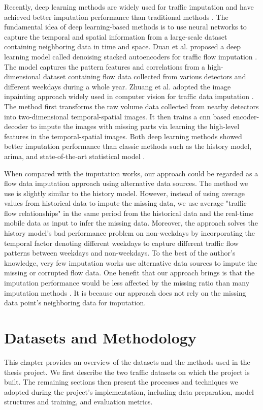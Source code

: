 \documentclass[english]{kththesis}
\begin{document}
Recently, deep learning methods are widely used for traffic imputation and have achieved better imputation performance than traditional methods \cite{duan_dl_imputation, zhuang_cnn_imputation}. The fundamental idea of deep learning-based methods is to use neural networks to capture the temporal and spatial information from a large-scale dataset containing neighboring data in time and space. Duan et al. proposed a deep learning model called denoising stacked autoencoders for traffic flow imputation \cite{duan_dl_imputation}. The model captures the pattern features and correlations from a high-dimensional dataset containing flow data collected from various detectors and different weekdays during a whole year. Zhuang et al. adopted the image inpainting approach widely used in computer vision for traffic data imputation \cite{zhuang_cnn_imputation}. The method first transforms the raw volume data collected from nearby detectors into two-dimensional temporal-spatial images. It then trains a \gls{cnn} based encoder-decoder to impute the images with missing parts via learning the high-level features in the temporal-spatial images. Both deep learning methods showed better imputation performance than classic methods such as the history model, \gls{arima}, and state-of-the-art statistical model \cite{duan_dl_imputation, zhuang_cnn_imputation}.

When compared with the imputation works, our approach could be regarded as a flow data imputation approach using alternative data sources. The method we use is slightly similar to the history model. However, instead of using average values from historical data to impute the missing data, we use average "traffic flow relationships" in the same period from the historical data and the real-time mobile data as input to infer the missing data. Moreover, the approach solves the history model's bad performance problem on non-weekdays by incorporating the temporal factor denoting different weekdays to capture different traffic flow patterns between weekdays and non-weekdays. To the best of the author's knowledge, very few imputation works use alternative data sources to impute the missing or corrupted flow data. One benefit that our approach brings is that the imputation performance would be less affected by the missing ratio than many imputation methods \cite{zhuang_cnn_imputation}. It is because our approach does not rely on the missing data point's neighboring data for imputation.



\chapter{Datasets and Methodology}
\label{ch:methodologyAndDatasets}
This chapter provides an overview of the datasets and the methods used in the thesis project. We first describe the two traffic datasets on which the project is built. The remaining sections then present the processes and techniques we adopted during the project's implementation, including data preparation, model structures and training, and evaluation metrics.
\end{document}
